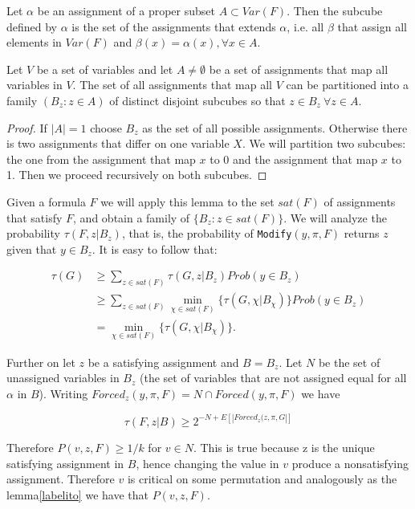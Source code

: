 \begin{definition}

  Let $\alpha$ be an assignment of a proper subset $A \subset Var(F)$. Then the subcube defined by $\alpha$ is the set of the assignments that extends $\alpha$, i.e. all $\beta$ that assign all elements in $Var(F)$ and $\beta(x)=\alpha(x), \forall x \in A$.
\end{definition}

\begin{lemma}
  Let $V$ be a set of variables and let $A\ne \emptyset$ be a set of assignments that map all variables in $V$. The set of all assignments that map all $V$ can be partitioned into a family $(B_z : z \in A)$ of distinct disjoint subcubes so that $z \in B_z \ \forall z \in A$.
\end{lemma}

\begin{proof}
  If $|A|=1$ choose $B_z$ as the set of all possible assignments. Otherwise there is two assignments that differ on one variable $X$. We will partition two subcubes: the one from the assignment that map $x$ to 0 and the assignment that map $x$ to 1. Then we proceed recursively on both subcubes.
\end{proof}


Given a formula $F$ we will apply this lemma to the set $sat(F)$ of assignments that satisfy $F$, and obtain a family of $\{B_z : z \in sat(F)\}$. We will analyze the probability $\tau(F, z | B_z)$, that is, the probability of \texttt{Modify}$(y, \pi, F)$ returns $z$ given that $y \in B_z$. It is easy to follow that:



\begin{align*}
  \tau(G) & \ge \sum_{z\in sat(F)}  \tau(G, z | B_z) Prob(y \in B_z)\\  &\ge  \sum_{z\in sat(F)} \min_{\chi \in sat(F)} \{\tau(G, \chi | B_\chi)\}  Prob(y \in B_z)\\ & = \min_{\chi \in sat(F)} \{\tau(G, \chi | B_\chi)\}.
\end{align*}


Further on let $z$ be a satisfying assignment and $B = B_z$. Let $N$ be the set of unassigned variables in $B_z$ (the set of variables that are not assigned equal for all $\alpha$ in $B$). Writing $Forced_z (y,\pi,F) = N \cap Forced(y,\pi,F)$  we have

$$\tau(F, z | B) \ge 2^{-N + E[|Forced_z(z, \pi, G|]}$$

Therefore $P(v,z,F) \ge 1/k$ for $v\in N$. This is true because z is the unique satisfying assignment in $B$, hence changing the value in $v$ produce a nonsatisfying assignment. Therefore $v$ is critical on some permutation and analogously as the lemma\ref{labelito} we have that $P(v,z,F)$.

